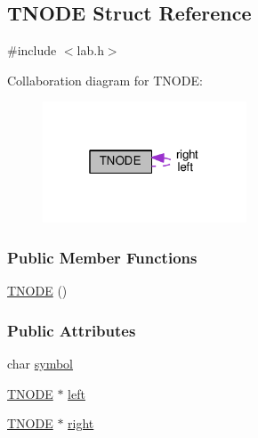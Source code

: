 \hypertarget{structTNODE}{\subsection{T\+N\+O\+D\+E Struct Reference}
\label{structTNODE}
}


{\ttfamily \#include $<$lab.\+h$>$}



Collaboration diagram for T\+N\+O\+D\+E\+:\nopagebreak
\begin{figure}[H]
\begin{center}
\leavevmode
\includegraphics[width=172pt]{structTNODE__coll__graph}
\end{center}
\end{figure}
\subsubsection*{Public Member Functions}
\begin{DoxyCompactItemize}
\item 
\hyperlink{structTNODE_a0f2d73dc28ef3be182dbb07464560a47}{T\+N\+O\+D\+E} ()
\end{DoxyCompactItemize}
\subsubsection*{Public Attributes}
\begin{DoxyCompactItemize}
\item 
char \hyperlink{structTNODE_a436db20d992c4227b8482603b4f76712}{symbol}
\item 
\hyperlink{structTNODE}{T\+N\+O\+D\+E} $\ast$ \hyperlink{structTNODE_ac8548d0ee2d54b914e0e07ab35375dba}{left}
\item 
\hyperlink{structTNODE}{T\+N\+O\+D\+E} $\ast$ \hyperlink{structTNODE_a4e135d9137519b2a4b89dbccb55ae967}{right}
\end{DoxyCompactItemize}


